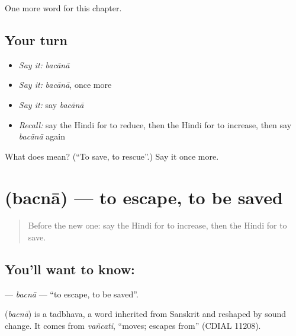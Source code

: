 \begin{grammarlens}[title={What you've built}]
One more word for this chapter.
\end{grammarlens}

\subsection*{Your turn}
\begin{itemize}
\raggedright
  \item \emph{Say it:} \emph{bacānā}
  \item \emph{Say it:} \emph{bacānā}, once more
  \item \emph{Say it:} say \emph{bacānā}
  \item \emph{Recall:} say the Hindi for to reduce, then the Hindi for to increase, then say \emph{bacānā} again
\end{itemize}

\begin{tcolorbox}[breakable,colback=teal!4,colframe=teal!35!black,title={Before you move on}]
What does  mean? (\textquotedblleft{}To save, to rescue\textquotedblright{}.) Say it once more.
\end{tcolorbox}
\section[\texorpdfstring{\hi{बचना} (bacnā)}{बचना (bacnā)}]{ (bacnā) — to escape, to be saved}

\label{lesson:HI-C169-bacna}



\begin{quote}
Before the new one: say the Hindi for to increase, then the Hindi for to save.
\end{quote}

\subsection*{You'll want to know: }
\textbf{} — \emph{bacnā} — \textquotedblleft{}to escape, to be saved\textquotedblright{}.

\begin{cousinweb}
\textbf{} (\emph{bacnā}) is a tadbhava, a word inherited from Sanskrit and reshaped by sound change. It comes from \emph{vañcati}, \textquotedblleft{}moves; escapes from\textquotedblright{} (CDIAL 11208).
\end{cousinweb}

